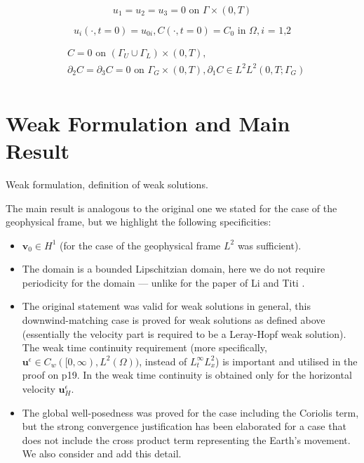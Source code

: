 \documentclass[11pt]{article}
\begin{document}
    \begin{equation} \label{HNSC6}   
    u_1 = u_2 = u_3 = 0 \text{ on } \Gamma \times (0,T)
    \end{equation}
    
    \begin{equation} \label{HNSC7}   
    u_i (\cdot, t=0) = u_{0 i}, C (\cdot, t=0) = C_0 \text{ in } \Omega, \text{$i$ = 1,2}
    \end{equation}
    
    \begin{equation} \label{HNSC8}
      \begin{split}
        &C = 0 \text{ on } ( \Gamma_U \cup \Gamma_L) \times (0,T), \\
        & \partial_2 C = \partial_3 C = 0 \text{ on } \Gamma_G \times (0,T), \partial_1 C \in L^2 L^2 (0,T; \Gamma_G) \\
      \end{split}
    \end{equation}

\section{Weak Formulation and Main Result} \label{weakformulationmainresult}

Weak formulation, definition of weak solutions. 

The main result is analogous to the original one we stated for the case of the geophysical frame, but we highlight the following specificities:

\begin{itemize}

  \item $\mathbf{v}_0 \in H^1$ (for the case of the geophysical frame $L^2$ was sufficient). 
  \item The domain is a bounded Lipschitzian domain, here we do not require periodicity for the domain --- unlike for the paper of Li and Titi \cite{li2019primitive}.
  \item The original statement was valid for weak solutions in general, this downwind-matching case is proved for weak solutions as defined above (essentially the velocity part is required to be a Leray-Hopf weak solution). The weak time continuity requirement (more specifically, $\mathbf{u}^\epsilon \in C_w( [ 0,\infty), L^2 (\Omega))$, instead of $L^\infty_t L^2_x$) is important and utilised in the proof on p19. In \cite{azerad2001mathematical} the weak time continuity is obtained only for the horizontal velocity $\mathbf{u}^\epsilon_H.$
  \item The global well-posedness was proved for the case including the Coriolis term, but the strong convergence justification has been elaborated for a case that does not include the cross product term representing the Earth's movement. We also consider and add this detail.

\end{itemize}
\end{document}
